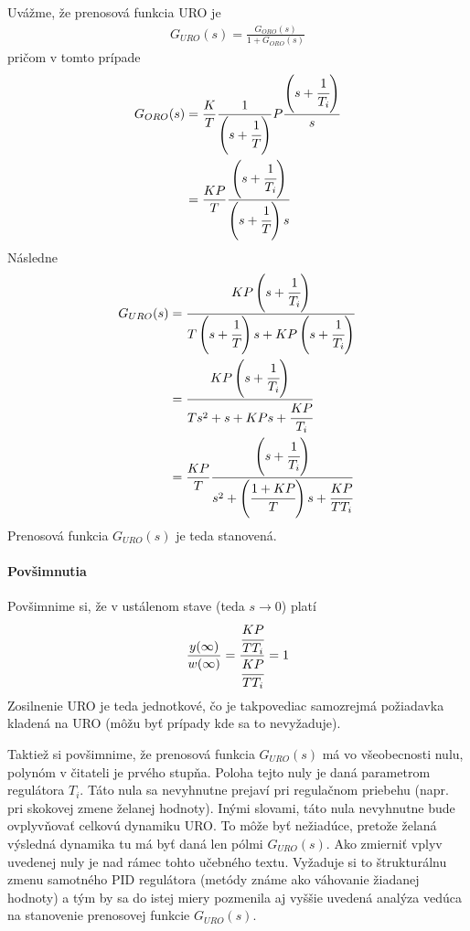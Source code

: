 \documentclass[a4paper, 10pt, ]{article}
\begin{document}
Uvážme, že prenosová funkcia URO je
\begin{align} 
    G_{URO}(s) = \frac{G_{ORO}(s)}{1+G_{ORO}(s)} 
\end{align}
pričom v tomto prípade
\begin{equation}
    \begin{aligned}
        G_{ORO}(s) &= \frac{K}{T} \frac{1}{ \left(s+\cfrac{1}{T}\right)}  P \frac{ \left(s+\cfrac{1}{T_i}\right) }{s} \\
        &= \frac{KP}{T} \frac{\left(s+\cfrac{1}{T_i}\right)}{ \left(s+\cfrac{1}{T}\right) s}
    \end{aligned}
\end{equation}
Následne
\begin{equation}
    \begin{aligned}
        G_{URO}(s) 
        &= 
        \frac{%
            KP \left( s + \cfrac{1}{T_i}\right)
            }{%
            T \left( s + \cfrac{1}{T}\right) s + KP \left( s + \cfrac{1}{T_i}\right)
            }
        \\
        &=
        \frac{%
            KP \left( s + \cfrac{1}{T_i}\right)
            }{%
            T s^2 + s + KPs + \cfrac{KP}{T_i}
            }
        \\
        &=
        \frac{KP}{T}
        \frac{%
            \left( s + \cfrac{1}{T_i}\right)
            }{%
            s^2 + \left(\cfrac{1 + KP}{T}\right) s + \cfrac{KP}{TT_i}
            }
    \end{aligned}
\end{equation}
Prenosová funkcia $G_{URO}(s)$ je teda stanovená.





\paragraph{Povšimnutia}

Povšimnime si, že v ustálenom stave (teda $s \to 0$) platí
\begin{equation}
    \frac{y(\infty)}{w(\infty)} = \frac{\cfrac{KP}{TT_i}}{\cfrac{KP}{TT_i}} = 1
\end{equation}
Zosilnenie URO je teda jednotkové, čo je takpovediac samozrejmá požiadavka kladená na URO (môžu byť prípady kde sa to nevyžaduje).

Taktiež si povšimnime, že prenosová funkcia $G_{URO}(s)$ má vo všeobecnosti nulu, polynóm v čitateli je prvého stupňa. Poloha tejto nuly je daná parametrom regulátora $T_i$. Táto nula sa nevyhnutne prejaví pri regulačnom priebehu (napr. pri skokovej zmene želanej hodnoty). Inými slovami, táto nula nevyhnutne bude ovplyvňovať celkovú dynamiku URO. To môže byť nežiadúce, pretože želaná výsledná dynamika tu má byť daná len pólmi $G_{URO}(s)$. Ako zmierniť vplyv uvedenej nuly je nad rámec tohto učebného textu. Vyžaduje si to štrukturálnu zmenu samotného PID regulátora (metódy známe ako váhovanie žiadanej hodnoty) a tým by sa do istej miery pozmenila aj vyššie uvedená analýza vedúca na stanovenie prenosovej funkcie $G_{URO}(s)$.
\end{document}
